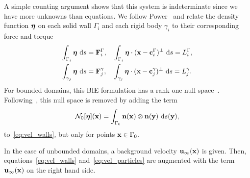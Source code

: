 \documentclass[preprint, 10pt]{elsarticle}
\begin{document}
A simple counting argument shows that this system is indeterminate since we have more unknowns than equations. We follow Power~\cite{Power1993} and
relate the density function ${\boldsymbol\eta}$ on each solid wall $\Gamma_i$ and
each rigid body $\gamma_i$ to their corresponding force and torque
\begin{equation}
  \label{eq:closure}
  \begin{aligned}
    \int_{\Gamma_i} {\boldsymbol\eta}~\text{d}s &= {\mathbf{F}}^\Gamma_i, \quad
    \int_{\Gamma_i} {\boldsymbol\eta}\cdot ({\mathbf{x}} - {\mathbf{c}}^\Gamma_i)^\perp~\text{d}s = L^\Gamma_i, \\
    \int_{\gamma_j} {\boldsymbol\eta}~\text{d}s &= {\mathbf{F}}^\gamma_j, \quad
    \int_{\gamma_j} {\boldsymbol\eta}\cdot ({\mathbf{x}} - {\mathbf{c}}^\gamma_j)^\perp~\text{d}s = L^\gamma_j.
  \end{aligned}
\end{equation}
For bounded domains, this BIE
formulation has a rank one null space~\cite{Ladyzhenskaya1963}.
Following~\cite{Power1993}, this null space is removed by adding the
term
\begin{align}
  \label{eq:N0_modification}
  \mathcal{N}_0[{\boldsymbol\eta}]({\mathbf{x}}) = \int_{\Gamma_0}
  {\mathbf{n}}({\mathbf{x}})\otimes{\mathbf{n}}({\mathbf{y}})~\text{d}s(\mathbf{y}),
\end{align}
to~\eqref{eq:vel_walls}, but only for points ${\mathbf{x}} \in \Gamma_0$.

In the case of unbounded domains, a background velocity
${\mathbf{u}}_\infty({\mathbf{x}})$ is given.  Then, equations~\eqref{eq:vel_walls}
and~\eqref{eq:vel_particles} are augmented with the term
${\mathbf{u}}_\infty({\mathbf{x}})$ on the right hand side. 




\end{document}
